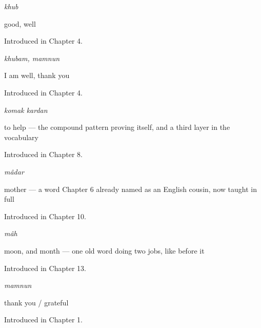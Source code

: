 \noindent\begin{minipage}[t]{\linewidth}
\raggedright
\textbf{}\enspace\emph{khub}\par
\small good, well\par
\footnotesize Introduced in Chapter 4.
\end{minipage}\par\medskip

\noindent\begin{minipage}[t]{\linewidth}
\raggedright
\textbf{ }\enspace\emph{khubam, mamnun}\par
\small I am well, thank you\par
\footnotesize Introduced in Chapter 4.
\end{minipage}\par\medskip

\noindent\begin{minipage}[t]{\linewidth}
\raggedright
\textbf{ }\enspace\emph{komak kardan}\par
\small to help — the compound pattern proving itself, and a third layer in the vocabulary\par
\footnotesize Introduced in Chapter 8.
\end{minipage}\par\medskip

\noindent\begin{minipage}[t]{\linewidth}
\raggedright
\textbf{}\enspace\emph{mâdar}\par
\small mother — a word Chapter 6 already named as an English cousin, now taught in full\par
\footnotesize Introduced in Chapter 10.
\end{minipage}\par\medskip

\noindent\begin{minipage}[t]{\linewidth}
\raggedright
\textbf{}\enspace\emph{mâh}\par
\small moon, and month — one old word doing two jobs, like  before it\par
\footnotesize Introduced in Chapter 13.
\end{minipage}\par\medskip

\noindent\begin{minipage}[t]{\linewidth}
\raggedright
\textbf{}\enspace\emph{mamnun}\par
\small thank you / grateful\par
\footnotesize Introduced in Chapter 1.
\end{minipage}\par\medskip

